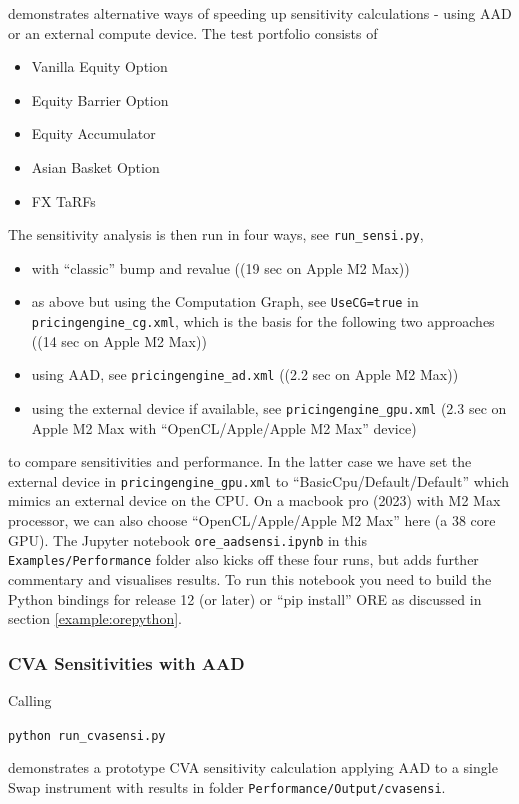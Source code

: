 \medskip
demonstrates alternative ways of speeding up sensitivity calculations - using AAD or an external compute device.
The test portfolio consists of
\begin{itemize}
\item Vanilla Equity Option
\item Equity Barrier Option
\item Equity Accumulator
\item Asian Basket Option
\item FX TaRFs
\end{itemize}
The sensitivity analysis is then run in four ways, see {\tt run\_sensi.py},
\begin{itemize}
\item with ``classic'' bump and revalue ((19 sec on Apple M2 Max))
\item as above but using the Computation Graph, see {\tt UseCG=true} in {\tt pricingengine\_cg.xml}, which
  is the basis for the following two approaches ((14 sec on Apple M2 Max))
\item using AAD, see {\tt pricingengine\_ad.xml} ((2.2 sec on Apple M2 Max))
\item using the external device if available, see {\tt pricingengine\_gpu.xml} (2.3 sec on Apple M2 Max with ``OpenCL/Apple/Apple M2 Max'' device)
\end{itemize}
to compare sensitivities and performance. In the latter case we have set the external device in
{\tt pricingengine\_gpu.xml} to ``BasicCpu/Default/Default'' which mimics an external device on the CPU.
On a macbook pro (2023) with M2 Max processor, we can also choose
``OpenCL/Apple/Apple M2 Max'' here (a 38 core GPU).
The Jupyter notebook {\tt ore\_aadsensi.ipynb} in this {\tt Examples/Performance} folder also kicks
off these four runs, but adds further commentary and visualises results.
To run this notebook you need to build the Python bindings for release 12 (or later)
or ``pip install'' ORE as discussed in section \ref{example:orepython}.

\subsubsection{CVA Sensitivities with AAD}

Calling
\medskip
\centerline {\tt python run\_cvasensi.py}

\medskip
demonstrates a prototype CVA sensitivity calculation applying AAD to a single Swap instrument
with results in folder {\tt Performance/Output/cvasensi}.

